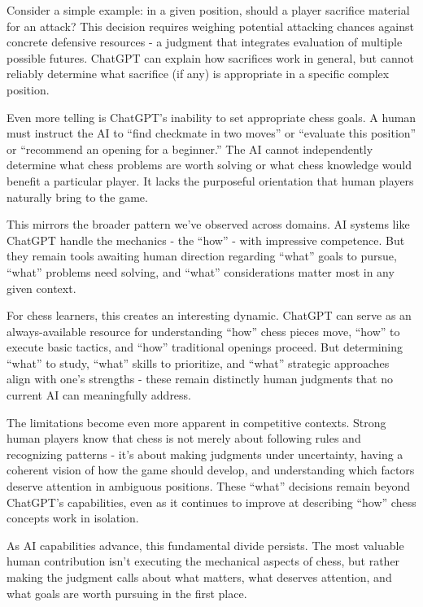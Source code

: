 \documentclass[
  Letterpaper,
]{scrbook}
\begin{document}
Consider a simple example: in a given position, should a player
sacrifice material for an attack? This decision requires weighing
potential attacking chances against concrete defensive resources - a
judgment that integrates evaluation of multiple possible futures.
ChatGPT can explain how sacrifices work in general, but cannot reliably
determine what sacrifice (if any) is appropriate in a specific complex
position.

Even more telling is ChatGPT's inability to set appropriate chess goals.
A human must instruct the AI to ``find checkmate in two moves'' or
``evaluate this position'' or ``recommend an opening for a beginner.''
The AI cannot independently determine what chess problems are worth
solving or what chess knowledge would benefit a particular player. It
lacks the purposeful orientation that human players naturally bring to
the game.

This mirrors the broader pattern we've observed across domains. AI
systems like ChatGPT handle the mechanics - the ``how'' - with
impressive competence. But they remain tools awaiting human direction
regarding ``what'' goals to pursue, ``what'' problems need solving, and
``what'' considerations matter most in any given context.

For chess learners, this creates an interesting dynamic. ChatGPT can
serve as an always-available resource for understanding ``how'' chess
pieces move, ``how'' to execute basic tactics, and ``how'' traditional
openings proceed. But determining ``what'' to study, ``what'' skills to
prioritize, and ``what'' strategic approaches align with one's strengths
- these remain distinctly human judgments that no current AI can
meaningfully address.

The limitations become even more apparent in competitive contexts.
Strong human players know that chess is not merely about following rules
and recognizing patterns - it's about making judgments under
uncertainty, having a coherent vision of how the game should develop,
and understanding which factors deserve attention in ambiguous
positions. These ``what'' decisions remain beyond ChatGPT's
capabilities, even as it continues to improve at describing ``how''
chess concepts work in isolation.

As AI capabilities advance, this fundamental divide persists. The most
valuable human contribution isn't executing the mechanical aspects of
chess, but rather making the judgment calls about what matters, what
deserves attention, and what goals are worth pursuing in the first
place.
\end{document}
